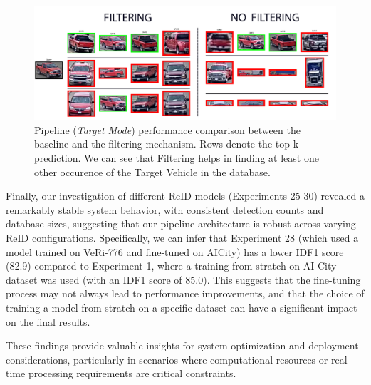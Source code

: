 \begin{figure}[H]
    \centering
    \includegraphics[width=1.0\textwidth]{images/MTMCPerformance.png}
    \caption[MTMC Performance]{Pipeline (\textit{Target Mode}) performance comparison between the baseline and the filtering mechanism. Rows denote the top-k prediction. We can see that Filtering helps in finding at least one other occurence of the Target Vehicle in the database.}
    \label{fig:MTMCPerformance}
\end{figure}

Finally, our investigation of different ReID models (Experiments 25-30) revealed a remarkably stable system behavior, with consistent detection counts and database sizes, suggesting that our pipeline architecture is robust across varying ReID configurations. Specifically, we can infer that Experiment 28 (which used a model trained on VeRi-776 and fine-tuned on AICity) has a lower IDF1 score (82.9) compared to Experiment 1, where a training from stratch on AI-City dataset was used (with an IDF1 score of 85.0). This suggests that the fine-tuning process may not always lead to performance improvements, and that the choice of training a model from stratch on a specific dataset can have a significant impact on the final results.

These findings provide valuable insights for system optimization and deployment considerations, particularly in scenarios where computational resources or real-time processing requirements are critical constraints.
